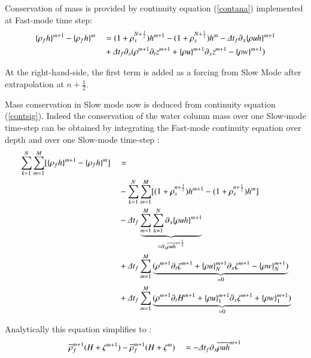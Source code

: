 \documentclass[a4paper,11pt]{article}
\begin{document}
  Conservation of mass is provided by continuity equation (\ref{contana}) implemented at Fast-mode time step:
  \begin{equation}
  \label{contsig}
   \begin{split}
    \displaystyle   
    & \{\rho_f h\}^{m+1} - \{\rho_f h\}^m  &&= (1+\rho_s^{N+\frac12})h^{m+1} - (1+\rho_s^{N+\frac12})h^{m} 
    - \Delta t_f \partial_x \{\rho uh\}^{m+1} \\
    & && +\Delta t_f \partial_s(\rho^{m+1}\partial_t z^{m+1}+ \{\rho u\}^{m+1}\partial_x z^{m+1}- \{\rho w\}^{m+1} )
   \end{split}
  \end{equation}
  
  At the right-hand-side, the first term is added as a forcing from Slow Mode after extrapolation at $n+\frac12$.
  
  Mass conservation in Slow mode now is deduced from continuity equation (\ref{contsig}). Indeed the conservation of the water column mass over one Slow-mode time-step can be obtained by integrating the Fast-mode continuity equation over depth and over one Slow-mode time-step :
  \begin{equation}
  \label{contsigtzcomp}
   \begin{split}
    \displaystyle   
    & \sum_{k=1}^{N} \sum_{m=1}^{M} \Huge[ \{\rho_f h\}^{m+1} - \{\rho_f h\}^m \Huge]  &&=    \\
    & && - \sum_{k=1}^{N} \sum_{m=1}^{M} \Huge[ (1+\rho_s^{n+\frac12})h^{m+1} - (1+\rho_s^{n+\frac12})h^{m} \Huge]    \\
    & && - \Delta t_f \underbrace{\sum_{m=1}^{M}  \sum_{k=1}^{N} \partial_x \{\rho uh\}^{m+1}}_{=\partial_x \overline{\rho uh}^{n+\frac12}}  \\
    & && +\Delta t_f \sum_{m=1}^{M}  
         \underbrace{(\rho^{m+1}\partial_t \zeta^{m+1}+ \{\rho u\}_N^{m+1}\partial_x\zeta^{m+1}- \{\rho w\}_N^{m+1} )}_{=0} \\
    & &&+\Delta t_f \sum_{m=1}^{M}  
          \underbrace{(\rho^{m+1}\partial_t H^{m+1}+ \{\rho u\}_1^{m+1}\partial_x\zeta^{m+1}+ \{\rho w\}_1^{m+1} )}_{=0}
   \end{split}
  \end{equation}
  
  Analytically this equation simplifies to : 
  \begin{equation}
  \label{contsigtz}
   \begin{split}
    \displaystyle   
    & \overline{\rho}_f^{m+1}(H+\zeta^{m+1}) - \overline{\rho}_f^{m+1} (H+\zeta^m) &&=
    - \Delta t_f \partial_x \overline{\rho uh} ^{m+1} \\
   \end{split}
  \end{equation}
  
\end{document}
